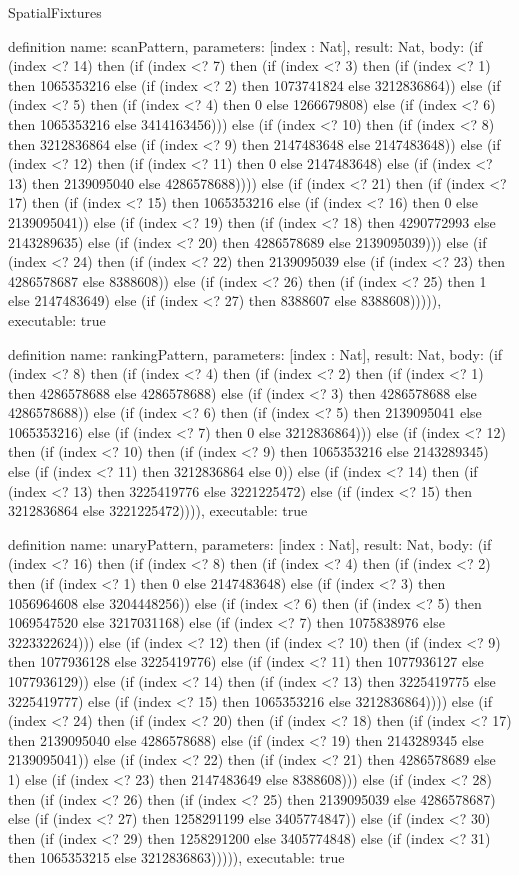 \begin{lexlean}{SpatialFixtures}
\begin{semanticmodule}
definition{
  name: scanPattern,
  parameters: [index : Nat],
  result: Nat,
  body: (if (index <? 14) then (if (index <? 7) then (if (index <? 3) then (if (index <? 1) then 1065353216 else (if (index <? 2) then 1073741824 else 3212836864)) else (if (index <? 5) then (if (index <? 4) then 0 else 1266679808) else (if (index <? 6) then 1065353216 else 3414163456))) else (if (index <? 10) then (if (index <? 8) then 3212836864 else (if (index <? 9) then 2147483648 else 2147483648)) else (if (index <? 12) then (if (index <? 11) then 0 else 2147483648) else (if (index <? 13) then 2139095040 else 4286578688)))) else (if (index <? 21) then (if (index <? 17) then (if (index <? 15) then 1065353216 else (if (index <? 16) then 0 else 2139095041)) else (if (index <? 19) then (if (index <? 18) then 4290772993 else 2143289635) else (if (index <? 20) then 4286578689 else 2139095039))) else (if (index <? 24) then (if (index <? 22) then 2139095039 else (if (index <? 23) then 4286578687 else 8388608)) else (if (index <? 26) then (if (index <? 25) then 1 else 2147483649) else (if (index <? 27) then 8388607 else 8388608))))),
  executable: true
}

definition{
  name: rankingPattern,
  parameters: [index : Nat],
  result: Nat,
  body: (if (index <? 8) then (if (index <? 4) then (if (index <? 2) then (if (index <? 1) then 4286578688 else 4286578688) else (if (index <? 3) then 4286578688 else 4286578688)) else (if (index <? 6) then (if (index <? 5) then 2139095041 else 1065353216) else (if (index <? 7) then 0 else 3212836864))) else (if (index <? 12) then (if (index <? 10) then (if (index <? 9) then 1065353216 else 2143289345) else (if (index <? 11) then 3212836864 else 0)) else (if (index <? 14) then (if (index <? 13) then 3225419776 else 3221225472) else (if (index <? 15) then 3212836864 else 3221225472)))),
  executable: true
}

definition{
  name: unaryPattern,
  parameters: [index : Nat],
  result: Nat,
  body: (if (index <? 16) then (if (index <? 8) then (if (index <? 4) then (if (index <? 2) then (if (index <? 1) then 0 else 2147483648) else (if (index <? 3) then 1056964608 else 3204448256)) else (if (index <? 6) then (if (index <? 5) then 1069547520 else 3217031168) else (if (index <? 7) then 1075838976 else 3223322624))) else (if (index <? 12) then (if (index <? 10) then (if (index <? 9) then 1077936128 else 3225419776) else (if (index <? 11) then 1077936127 else 1077936129)) else (if (index <? 14) then (if (index <? 13) then 3225419775 else 3225419777) else (if (index <? 15) then 1065353216 else 3212836864)))) else (if (index <? 24) then (if (index <? 20) then (if (index <? 18) then (if (index <? 17) then 2139095040 else 4286578688) else (if (index <? 19) then 2143289345 else 2139095041)) else (if (index <? 22) then (if (index <? 21) then 4286578689 else 1) else (if (index <? 23) then 2147483649 else 8388608))) else (if (index <? 28) then (if (index <? 26) then (if (index <? 25) then 2139095039 else 4286578687) else (if (index <? 27) then 1258291199 else 3405774847)) else (if (index <? 30) then (if (index <? 29) then 1258291200 else 3405774848) else (if (index <? 31) then 1065353215 else 3212836863))))),
  executable: true
}


\end{semanticmodule}
\end{lexlean}
